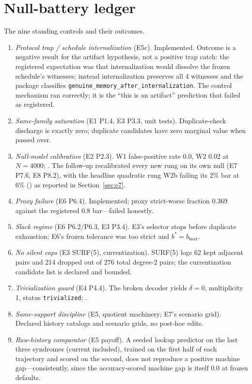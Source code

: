 \section{Null-battery ledger}
\label{app:nulls}

The nine standing controls and their outcomes.

\begin{enumerate}
\item \emph{Protocol trap / schedule internalization} (E5c). Implemented. Outcome is a negative result for the artifact hypothesis, not a positive trap catch: the registered expectation was that internalization would dissolve the frozen schedule's witnesses; instead internalization preserves all 4 witnesses and the package classifies \texttt{genuine\_memory\_after\_internalization}. The control mechanism ran correctly; it is the ``this is an artifact'' prediction that failed as registered. %
\item \emph{Same-family saturation} (E1 P1.4, E3 P3.3, unit tests). Duplicate-check discharge is exactly zero; duplicate candidates have zero marginal value when passed over. %
\item \emph{Null-model calibration} (E2 P2.3). W1 false-positive rate 0.0, W2 0.02 at $N{=}4000$; \gRegPos. The follow-up recalibrated every new rung on its own null (E7 P7.6, E8 P8.2), with the headline quadratic rung W2b failing its 2\% bar at 6\% (\gRegNeg) as reported in Section~\ref{sec:e7}. %
\item \emph{Proxy failure} (E6 P6.4). Implemented; proxy strict-worse fraction 0.369 against the registered 0.8 bar---failed honestly. %
\item \emph{Slack regime} (E6 P6.2/P6.3, E3 P3.4). E3's selector stops before duplicate exhaustion; E6's frozen tolerance was too strict and $b^{*} = b_{\max}$. %
\item \emph{No silent caps} (E3 SURF(5), currentization). SURF(5) logs 62 kept adjacent pairs and 214 dropped out of 276 total degree-2 pairs; the currentization candidate list is declared and bounded. %
\item \emph{Trivialization guard} (E4 P4.4). The broken decoder yields $\delta = 0$, multiplicity 1, status \texttt{trivialized}; \gRegPos. %
\item \emph{Same-support discipline} (E5, quotient machinery; E7's scenario grid). Declared history catalogs and scenario grids, no post-hoc edits.
\item \emph{Raw-history comparator} (E5 payoff). A seeded lookup predictor on the last three syndromes (current included), trained on the first half of each trajectory and scored on the second, does not reproduce a positive machine gap---consistently, since the accuracy-scored machine gap is itself 0.0 at frozen defaults. %
\end{enumerate}

